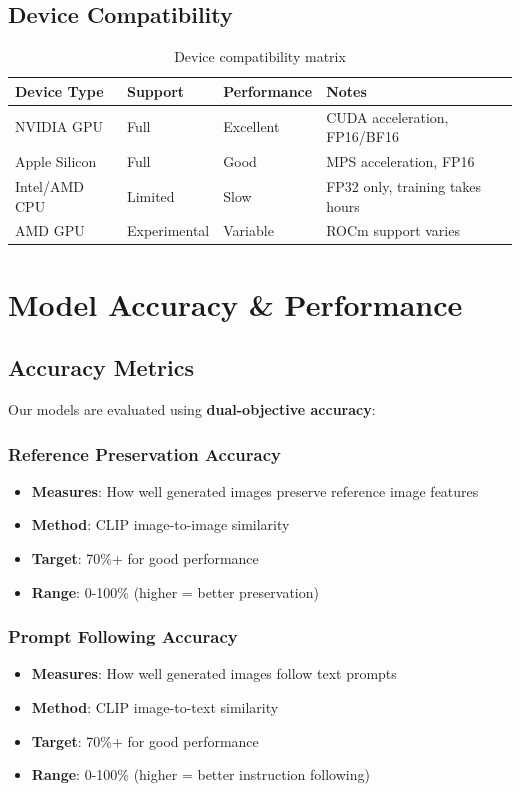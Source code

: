 \documentclass[11pt,a4paper]{article}
\begin{document}
\subsection{Device Compatibility}

\begin{table}[h]
\centering
\begin{tabular}{@{}llll@{}}
\toprule
\textbf{Device Type} & \textbf{Support} & \textbf{Performance} & \textbf{Notes} \\
\midrule
NVIDIA GPU &  Full& Excellent & CUDA acceleration, FP16/BF16 \\
Apple Silicon &  Full& Good & MPS acceleration, FP16 \\
Intel/AMD CPU &  Limited& Slow & FP32 only, training takes hours \\
AMD GPU &Experimental& Variable & ROCm support varies \\
\bottomrule
\end{tabular}
\caption{Device compatibility matrix}
\end{table}

\section{Model Accuracy \& Performance}

\subsection{Accuracy Metrics}

Our models are evaluated using \textbf{dual-objective accuracy}:

\subsubsection{Reference Preservation Accuracy}
\begin{itemize}
    \item \textbf{Measures}: How well generated images preserve reference image features
    \item \textbf{Method}: CLIP image-to-image similarity
    \item \textbf{Target}: 70\%+ for good performance
    \item \textbf{Range}: 0-100\% (higher = better preservation)
\end{itemize}

\subsubsection{Prompt Following Accuracy}
\begin{itemize}
    \item \textbf{Measures}: How well generated images follow text prompts
    \item \textbf{Method}: CLIP image-to-text similarity
    \item \textbf{Target}: 70\%+ for good performance
    \item \textbf{Range}: 0-100\% (higher = better instruction following)
\end{itemize}
\end{document}
